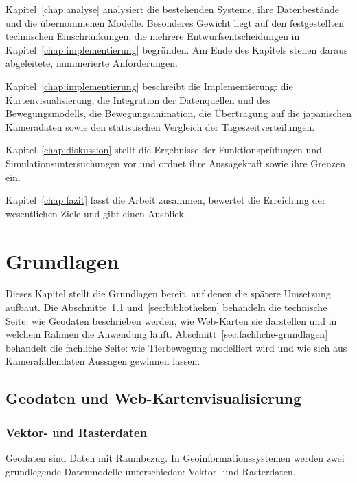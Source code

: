 \documentclass[12pt,a4paper]{report}
\begin{document}
Kapitel~\ref{chap:analyse} analysiert die bestehenden Systeme, ihre Datenbestände und die
übernommenen Modelle. Besonderes Gewicht liegt auf den festgestellten technischen
Einschränkungen, die mehrere Entwurfsentscheidungen in
Kapitel~\ref{chap:implementierung} begründen. Am Ende des Kapitels stehen daraus
abgeleitete, nummerierte Anforderungen.

Kapitel~\ref{chap:implementierung} beschreibt die
Implementierung: die Kartenvisualisierung,
die Integration der Datenquellen und des
Bewegungsmodells, die Bewegungsanimation,
die Übertragung auf die japanischen Kameradaten
sowie den statistischen Vergleich der
Tageszeitverteilungen.

Kapitel~\ref{chap:diskussion} stellt die
Ergebnisse der Funktionsprüfungen und
Simulationsuntersuchungen vor und ordnet ihre
Aussagekraft sowie ihre Grenzen ein.

Kapitel~\ref{chap:fazit} fasst die Arbeit
zusammen, bewertet die Erreichung der
wesentlichen Ziele und gibt einen Ausblick.

\chapter{Grundlagen}
\label{chap:grundlagen}

Dieses Kapitel stellt die Grundlagen bereit, auf denen die spätere Umsetzung aufbaut. Die
Abschnitte~\ref{sec:geodaten} und~\ref{sec:bibliotheken} behandeln die technische Seite:
wie Geodaten beschrieben werden, wie Web-Karten sie darstellen und in welchem Rahmen die
Anwendung läuft. Abschnitt~\ref{sec:fachliche-grundlagen} behandelt die fachliche Seite:
wie Tierbewegung modelliert wird und wie sich aus Kamerafallendaten Aussagen gewinnen
lassen.

\section{Geodaten und Web-Kartenvisualisierung}
\label{sec:geodaten}

\subsection{Vektor- und Rasterdaten}


Geodaten sind Daten mit Raumbezug. In
Geoinformationssystemen werden zwei grundlegende
Datenmodelle unterschieden: Vektor- und Rasterdaten.
\end{document}
